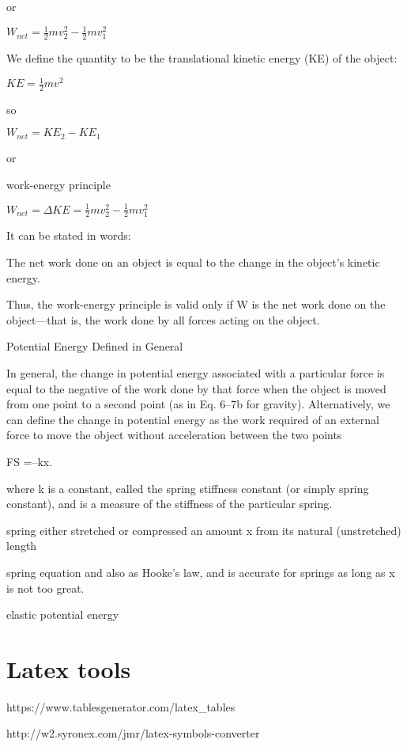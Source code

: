 \documentclass{extarticle}
\begin{document}
or

$W_{net} = \frac{1}{2}mv_2^2 - \frac{1}{2}mv_1^2$


We define the quantity
to be the translational kinetic energy (KE) of the object:

$KE = \frac{1}{2}mv^2$

so 

$W_{net} = {KE}_2 - {KE}_1$

or 

work-energy principle

$W_{net} = \Delta KE = \frac{1}{2}mv_2^2 - \frac{1}{2}mv_1^2$

It can be stated in words:

The net work done on an object is equal to the change in the object’s
kinetic energy.


Thus, the work-energy principle is valid only if W is the net work done on the object—that is, the work done by all forces acting on the object.















Potential Energy Defined in General

In general, the change in potential energy
associated with a particular force is equal to the negative of the work done by
that force when the object is moved from one point to a second point (as in Eq. 6–7b
for gravity). Alternatively, we can define the change in potential energy as the
work required of an external force to move the object without acceleration between
the two points


















FS =–kx.

where k is a constant, called the spring stiffness constant (or simply spring constant),
and is a measure of the stiffness of the particular spring.

spring either
stretched or compressed an amount x from its natural (unstretched) length


spring equation and
also as Hooke’s law, and is accurate for springs as long as x is not too great.





elastic potential energy











\section{Latex tools}

https://www.tablesgenerator.com/latex\_tables

http://w2.syronex.com/jmr/latex-symbols-converter




\iftoggle{editing}{%
}{%
  \end{multicols}
}
\end{document}
